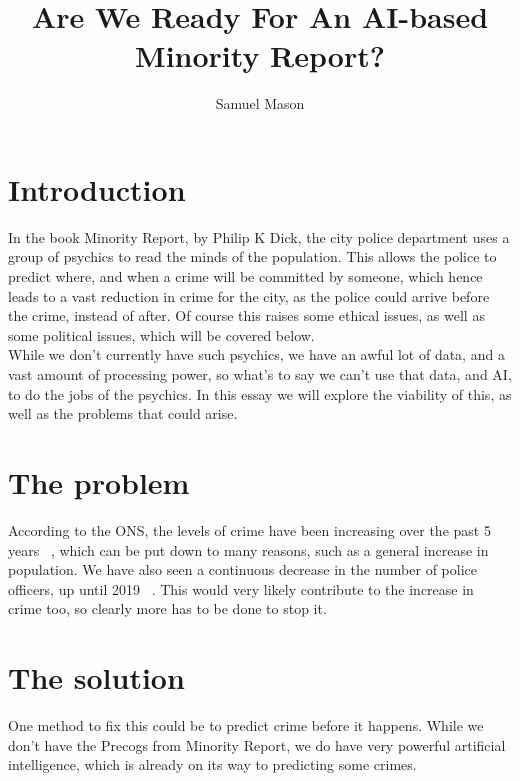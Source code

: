 \documentclass[12pt]{amsart}
\title{Are We Ready For An AI-based Minority Report?}
\author{Samuel Mason}
\begin{document}
    \maketitle
    \tableofcontents


    \section{Introduction}\label{sec:introduction}

    In the book Minority Report, by Philip K Dick, the city police department uses a group of psychics to read
    the minds of the population.
    This allows the police to predict where, and when a crime will be committed by someone, which hence leads to a vast
    reduction in crime for the city, as the police could arrive before the crime, instead of after.
    Of course this raises some ethical issues, as well as some political issues, which will be covered below.
    \\
    While we don't currently have such psychics, we have an awful lot of data, and a vast amount of processing power, so
    what's to say we can't use that data, and AI, to do the jobs of the psychics.
    In this essay we will explore the viability of this, as well as the problems that could arise.

    \section{The problem}\label{sec:the-problem}

    According to the ONS, the levels of crime have been increasing over the past 5 years ~\cite{ons-crime}, which can be
    put down to many reasons, such as a general increase in population.
    We have also seen a continuous decrease in the number of police officers, up until 2019 ~\cite{ho-pw}.
    This would very likely contribute to the increase in crime too, so clearly more has to be done to stop it.

    \section{The solution}\label{sec:the-solution}

    One method to fix this could be to predict crime before it happens.
    While we don't have the Precogs from Minority Report, we do have very powerful artificial intelligence, which is
    already on its way to predicting some crimes.
    \\
\end{document}
